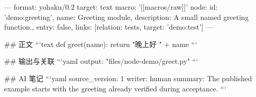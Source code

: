 ---
format: yohaku/0.2
target: text
macro: '[[macros/raw]]'
node: {id: 'demo:greeting', name: Greeting module, description: A small named greeting function., entry: false, links: [{relation: tests, target: 'demo:test'}]}
---

## 正文
```text
def greet(name):
    return "晚上好 " + name
```

## 输出与关联
```yaml
output: "files/node-demo/greet.py"
```

## AI 笔记
```yaml
source_version: 1
writer: human
summary: The published example starts with the greeting already verified during acceptance.
```
